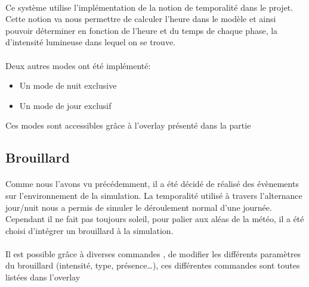 \paragraph{}

Ce système utilise l'implémentation de la notion de temporalité dans le projet.
Cette notion va nous permettre de calculer l'heure dans le modèle et ainsi
pouvoir déterminer en fonction de l'heure et du temps de chaque phase, la
d'intensité lumineuse dans lequel on se trouve.

\paragraph{}


\paragraph{}

Deux autres modes ont été implémenté:\\
\begin{itemize}
  \item Un mode de nuit exclusive
  \item Un mode de jour exclusif\\
\end{itemize}

Ces modes sont accessibles grâce à l'overlay présenté dans la partie %

\subsection{Brouillard}

\paragraph{}
Comme nous l'avons vu précédemment, il a été décidé de réalisé des évènements
sur l'environnement de la simulation. La temporalité utilisé à travers
l'alternance jour/nuit nous a permis de simuler le déroulement normal d'une
journée. Cependant il ne fait pas toujours soleil, pour palier aux aléas de la
météo, il a été choisi d'intégrer un brouillard à la simulation.

\paragraph{}
Il est possible grâce à diverses commandes , de modifier les différents
paramètres du brouillard (intensité, type, présence\ldots), ces différentes
commandes sont toutes listées dans l'overlay 


